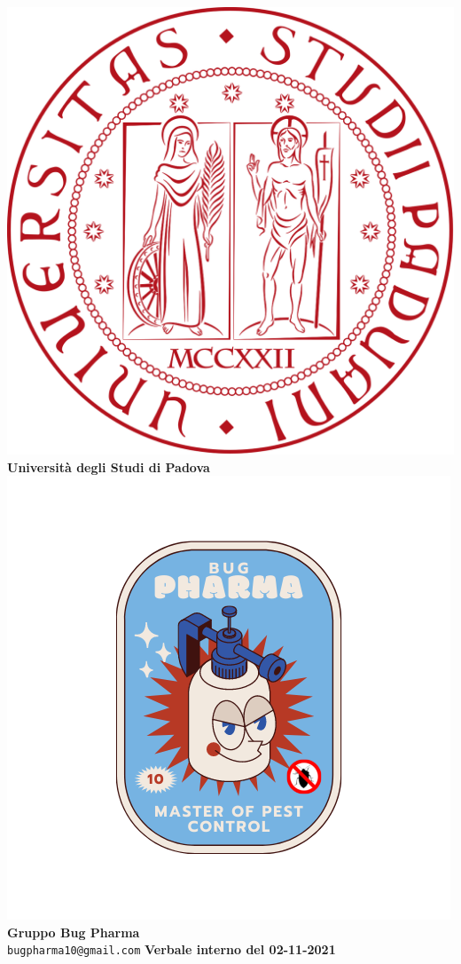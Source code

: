 \documentclass[11pt]{article}
\begin{document}
	\thispagestyle{empty}
	\begin{titlepage}
		\begin{center}
			\includegraphics[scale = 0.05]{../../Res/logo_unipd.png}\\
			\bigskip
			\large \textbf{Università degli Studi di Padova} \\
			\vfill
			\includegraphics[scale = 0.7]{../../Res/BugPharma_Logo.png}\\
			\huge \textbf{Gruppo Bug Pharma} \\
			\vfill
			\large \texttt{bugpharma10@gmail.com}
			\vfill
			\Huge \textbf{Verbale interno del 02-11-2021}\\
			

\end{center}
\end{titlepage}
\end{document}
